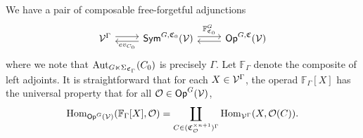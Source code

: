 \documentclass[a4paper,10pt
,draft
]{article}%
\renewcommand{\1}{\eta}%
\begin{document}
We have a pair of composable free-forgetful adjunctions
\[
      \begin{tikzcd}
            \V^\Gamma \arrow[r, shift left]
            &
            \Sym^{G, \mathfrak C_0}(\V) \arrow[l, shift left, "ev_{C_0}"] \arrow[r, shift left, "\mathbb F^G_{\mathfrak C_0}"]
            &
            \Op^{G, \mathfrak C}(\V) \arrow[l, shift left]
      \end{tikzcd}
\]
where we note that $\operatorname{Aut}_{G \ltimes \Sigma_{\mathfrak C_\Gamma}}(C_0)$ is precisely $\Gamma$.
Let $\mathbb F_\Gamma$ denote the composite of left adjoints.
It is straightforward that for each $X \in \mathcal V^\Gamma$,
the operad $\mathbb F_\Gamma[X]$ has the universal property that for all $\mathcal{O} \in \mathsf{Op}^G(\mathcal V)$,
\begin{equation}
      \operatorname{Hom}_{\mathsf{Op}^G(\mathcal V)}(\mathbb F_\Gamma[X], \mathcal{O}) = \mathop\coprod\limits_{C \in (\mathfrak C_{\mathcal{O}}^{\times n+1})^\Gamma}\operatorname{Hom}_{\mathcal V^\Gamma}(X, \mathcal{O}(C)).
\end{equation}
\end{document}
